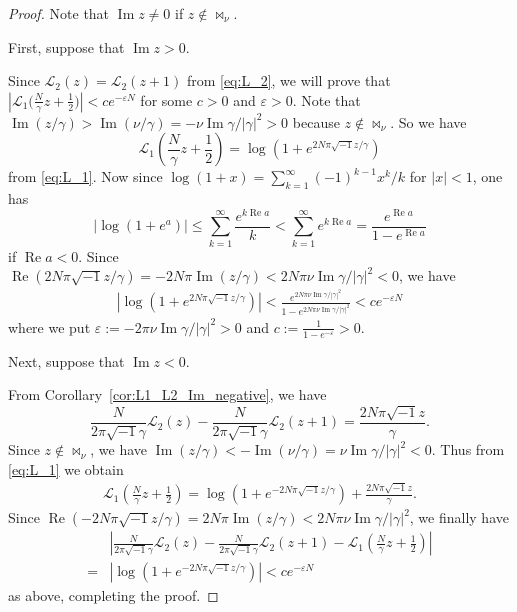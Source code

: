 \documentclass[a4paper,dvipdfmx]{amsart}
\theoremstyle{plain}
\theoremstyle{definition}
\theoremstyle{remark}
\renewcommand{\L}{\mathcal{L}}
\renewcommand{\Re}{\operatorname{Re}}
\renewcommand{\Im}{\operatorname{Im}}
\renewcommand{\i}{\sqrt{-1}}
\numberwithin{equation}{section}
\begin{document}
\begin{proof}
Note that $\Im{z}\ne0$ if $z\notin\bowtie_{\nu}$.
\par
First, suppose that $\Im{z}>0$.
\par
Since $\L_2(z)=\L_2(z+1)$ from \eqref{eq:L_2}, we will prove that $\left|\L_1\bigl(\frac{N}{\gamma}z+\frac{1}{2}\bigr)\right|<ce^{-\varepsilon N}$ for some $c>0$ and $\varepsilon>0$.
Note that $\Im(z/\gamma)>\Im(\nu/\gamma)=-\nu\Im\gamma/|\gamma|^2>0$ because $z\not\in\bowtie_{\nu}$.
So we have
\begin{equation*}
  \L_1\left(\frac{N}{\gamma}z+\frac{1}{2}\right)
  =
  \log\left(1+e^{2N\pi\i z/\gamma}\right)
\end{equation*}
from \eqref{eq:L_1}.
Now since $\log(1+x)=\sum_{k=1}^{\infty}(-1)^{k-1}x^{k}/k$ for $|x|<1$, one has
\begin{equation*}
  \bigl|\log\left(1+e^{a}\right)\bigr|
  \le
  \sum_{k=1}^{\infty}\frac{e^{k\Re{a}}}{k}
  <
  \sum_{k=1}^{\infty}e^{k\Re{a}}
  =
  \frac{e^{\Re{a}}}{1-e^{\Re{a}}}
\end{equation*}
if $\Re{a}<0$.
Since $\Re(2N\pi\i z/\gamma)=-2N\pi\Im(z/\gamma)<2N\pi\nu\Im\gamma/|\gamma|^2<0$, we have
\begin{align*}
  \left|
    \log\left(1+e^{2N\pi\i z/\gamma}\right)
  \right|
  <
  \frac{e^{2N\pi\nu\Im\gamma/|\gamma|^2}}{1-e^{2N\pi\nu\Im\gamma/|\gamma|^2}}
  <
  ce^{-\varepsilon N}
\end{align*}
where we put $\varepsilon:=-2\pi\nu\Im\gamma/|\gamma|^2>0$ and $c:=\frac{1}{1-e^{-\varepsilon}}>0$.
\par
Next, suppose that $\Im{z}<0$.
\par
From Corollary~\ref{cor:L1_L2_Im_negative}, we have
\begin{equation*}
  \frac{N}{2\pi\i\gamma}\L_2(z)-\frac{N}{2\pi\i\gamma}\L_2(z+1)
  =
  \frac{2N\pi\i z}{\gamma}.
\end{equation*}
Since $z\not\in\bowtie_{\nu}$, we have $\Im(z/\gamma)<-\Im(\nu/\gamma)=\nu\Im\gamma/|\gamma|^2<0$.
Thus from \eqref{eq:L_1} we obtain
\begin{align*}
  \L_1\left(\frac{N}{\gamma}z+\frac{1}{2}\right)
  =
  \log\left(1+e^{-2N\pi\i z/\gamma}\right)
  +
  \frac{2N\pi\i z}{\gamma}.
\end{align*}
Since $\Re(-2N\pi\i z/\gamma)=2N\pi\Im(z/\gamma)<2N\pi\nu\Im\gamma/|\gamma|^2$, we finally have
\begin{align*}
  &\left|
    \frac{N}{2\pi\i\gamma}\L_2(z)
    -
    \frac{N}{2\pi\i\gamma}\L_2(z+1)
    -
    \L_1\left(\frac{N}{\gamma}z+\frac{1}{2}\right)
  \right|
  \\
  =&
  \left|\log\left(1+e^{-2N\pi\i z/\gamma}\right)\right|
  <
  ce^{-\varepsilon N}
\end{align*}
as above, completing the proof.
\end{proof}
\end{document}
